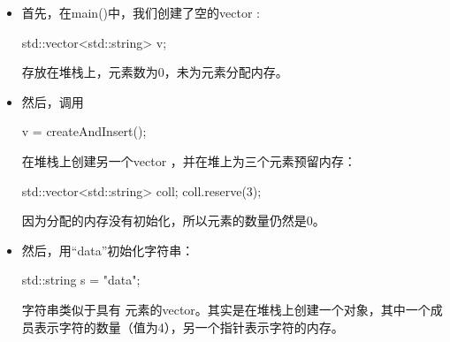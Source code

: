 \begin{itemize}
	\item 首先，在main()中，我们创建了空的vector :
\begin{cppcode}
std::vector<std::string> v;
\end{cppcode}
	存放在堆栈上，元素数为0，未为元素分配内存。
	\item 然后，调用
\begin{cppcode}
v = createAndInsert();
\end{cppcode}
	在堆栈上创建另一个vector ，并在堆上为三个元素预留内存：
\begin{cppcode}
std::vector<std::string> coll;
coll.reserve(3);
\end{cppcode}
	因为分配的内存没有初始化，所以元素的数量仍然是0。
	\item 然后，用“data”初始化字符串：
\begin{cppcode}
std::string s = "data";
\end{cppcode}
	字符串类似于具有  元素的vector。其实是在堆栈上创建一个对象，其中一个成员表示字符的数量（值为4），另一个指针表示字符的内存。


\end{itemize}
